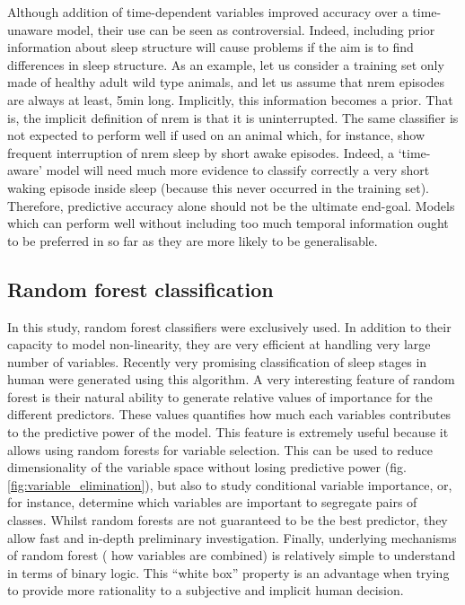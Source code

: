 Although addition of time-dependent variables improved accuracy over a time-unaware model, their use can be seen as controversial.
Indeed, including prior information about sleep structure will cause problems if the aim is to find differences in sleep structure.
As an example, let us consider a training set only made of healthy adult wild type animals,
and let us assume that \gls{nrem} episodes are always at least, 5min long.
Implicitly, this information becomes a prior. That is, the implicit definition of \gls{nrem} is that it
is uninterrupted.
The same classifier is not expected to perform well if used on an animal which, for instance, show frequent interruption of  \gls{nrem} sleep by short awake episodes.
Indeed, a `time-aware' model will need much more evidence to classify correctly a very short waking episode inside sleep (because this never occurred in the training set).
Therefore, predictive accuracy alone should not be the ultimate end-goal.
Models which can perform well without including too much temporal information ought to be preferred in so far as
they are more likely to be generalisable.



\subsection{Random forest classification}

In this study, random forest classifiers\cite{breiman_random_2001} were exclusively used.
In addition to their capacity to model non-linearity, they are very efficient at handling very large number of variables.
Recently very promising classification of sleep stages in human were generated
using this algorithm\cite{sen_comparative_2014}.
A very interesting feature of random forest is their
natural ability to generate relative values of importance for the different predictors.
These values quantifies how much each variables contributes to the predictive power of the model.
This feature is extremely useful because it allows using random forests for variable selection.
This can be used to reduce dimensionality of the variable space without losing predictive power (fig.\ref{fig:variable_elimination}),
but also to study conditional variable importance\cite{strobl_conditional_2008}, or, for instance,
determine which variables are important to segregate pairs of classes.
Whilst random forests are not guaranteed to be the best predictor, they allow fast and in-depth preliminary investigation.
Finally, underlying mechanisms of random forest (\ie{} how  variables are combined) is relatively simple to understand in terms of binary logic.
This ``white box'' property is an advantage when trying to provide more rationality to a subjective and implicit human decision.



